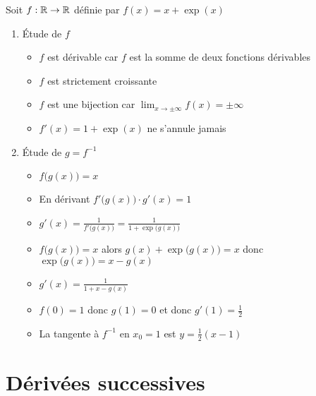 \begin{frame}

\begin{exemple}
Soit $f : \mathbb{R} \to \mathbb{R}$ définie par $f(x)=x+\exp(x)$
\pause
\begin{enumerate}
  \item \'Etude de $f$
\pause
  \begin{itemize}
    \item $f$ est dérivable car $f$ est la somme de deux fonctions dérivables
\pause
    \item $f$ est strictement croissante
\pause    
    \item $f$ est une bijection car $\lim_{x\to\pm\infty} f(x)=\pm\infty$
\pause    
    \item $f'(x) = 1 + \exp(x)$ ne s'annule jamais
  \end{itemize}
\pause  
  \item \'Etude de $g=f^{-1}$
\pause
  \begin{itemize}[<+->]
    \item $f\big( g(x) \big)  = x$ 
    \item En dérivant $f'\big(g(x)\big) \cdot g'(x) = 1$
    \item $g'(x) = \frac{1}{f'\big( g(x) \big)} = \frac{1}{1+\exp\big( g(x) \big)}$
    \item $f\big( g(x)\big) \!=\!x$ alors $g(x)+\exp\big( g(x) \big)\!=\!x$ donc 
$\exp\big( g(x) \big)=x-g(x)$
    \item $g'(x) =  \frac{1}{1+x -g(x)}$
    \item $f(0)=1$ donc $g(1)=0$ et donc $g'(1)=\frac12$
    \item La tangente à  $f^{-1}$ en $x_0=1$ est $y=\frac12 (x-1)$
  \end{itemize}
\end{enumerate}

\end{exemple}

\end{frame}

\begin{frame}
\end{frame}



\section*{Dérivées successives}


